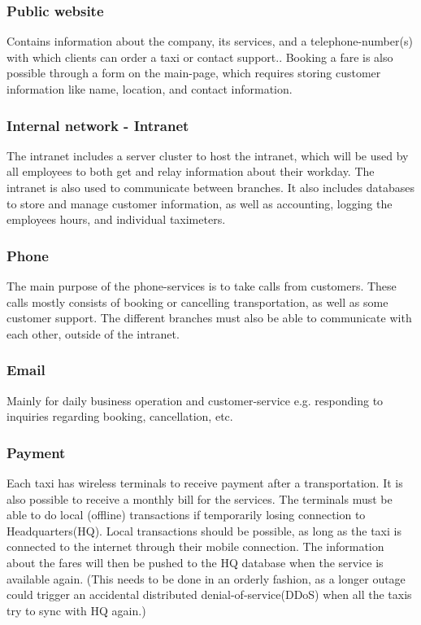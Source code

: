 \subsubsection{Public website}
\vspace{-0.6em}
Contains information about the company, its services, and a telephone-number(s) with which clients can order a taxi or contact support.. 
Booking a fare is also possible through a form on the main-page, which requires storing customer information like name, location, and contact information.

\subsubsection{Internal network - Intranet}
\vspace{-0.6em}
The intranet includes a server cluster to host the intranet, which will be used by all employees to both get and relay information about their workday. %
The intranet is also used to communicate between branches.
It also includes databases to store and manage customer information, as well as accounting, logging the employees hours, and individual taximeters.

\subsubsection{Phone}
\vspace{-0.6em}
The main purpose of the phone-services is to take calls from customers.
These calls mostly consists of booking or cancelling transportation, as well as some customer support. 
The different branches must also be able to communicate with each other, outside of the intranet.

\subsubsection{Email}
\vspace{-0.6em}
Mainly for daily business operation and customer-service e.g. responding to inquiries regarding booking, cancellation, etc.

\subsubsection{Payment}
\vspace{-0.6em}
Each taxi has wireless terminals to receive payment after a transportation. It is also possible to receive a monthly bill for the services. 
The terminals must be able to do local (offline) transactions if temporarily losing connection to Headquarters(HQ).
Local transactions should be possible, as long as the taxi is connected to the internet through their mobile connection. 
The information about the fares will then be pushed to the HQ database when the service is available again. (This needs to be done in an orderly fashion, as a longer outage could trigger an accidental distributed denial-of-service(DDoS) when all the taxis try to sync with HQ again.)

